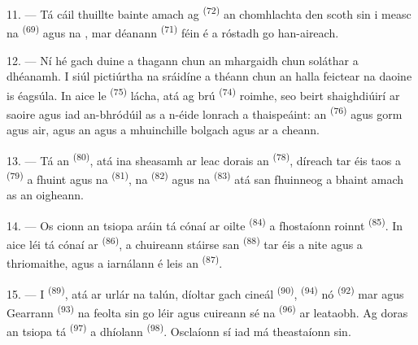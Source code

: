 11. --- Tá cáil thuillte bainte amach ag  \textsuperscript{(72)} an
chomhlachta den scoth sin i measc na 
\textsuperscript{(69)} agus na , mar déanann  \textsuperscript{(71)} féin é a róstadh go han-aireach.

\VUsaut{4.0mm}
\VUsaut{3.0mm}

12. --- Ní hé gach duine a thagann chun an mhargaidh chun soláthar a dhéanamh. I siúl
pictiúrtha na sráidíne a théann chun an halla feictear na daoine is éagsúla. In aice
le  \textsuperscript{(75)} lácha, atá ag brú
 \textsuperscript{(74)} roimhe, seo beirt shaighdiúirí ar saoire
agus iad an-bhródúil as a n-éide lonrach a thaispeáint: an 
\textsuperscript{(76)} agus  gorm agus  air,
agus an  agus a mhuinchille bolgach agus  ar
a cheann.

13. --- Tá an  \textsuperscript{(80)}, atá ina sheasamh ar leac
dorais an  \textsuperscript{(78)}, díreach tar éis taos a
 \textsuperscript{(79)} a fhuint agus na 
\textsuperscript{(81)}, na  \textsuperscript{(82)} agus na
 \textsuperscript{(83)} atá san fhuinneog a bhaint amach as an
oigheann.

14. --- Os cionn an tsiopa aráin tá cónaí ar  oilte
\textsuperscript{(84)} a fhostaíonn roinnt  \textsuperscript{(85)}.
In aice léi tá cónaí ar  \textsuperscript{(86)}, a
chuireann stáirse san  \textsuperscript{(88)} tar éis a nite agus a
thriomaithe, agus a iarnálann é leis an  \textsuperscript{(87)}.

\VUsaut{4.0mm}
\VUsaut{3.0mm}

15. --- I  \textsuperscript{(89)}, atá ar urlár na talún,
díoltar gach cineál  \textsuperscript{(90)},
 \textsuperscript{(94)} nó  \textsuperscript{(92)}
mar  agus  Gearrann
 \textsuperscript{(93)} na feolta sin go léir agus
cuireann sé na  \textsuperscript{(96)} ar leataobh. Ag doras an
tsiopa tá  \textsuperscript{(97)} a dhíolann 
\textsuperscript{(98)}. Osclaíonn sí iad má theastaíonn sin.

